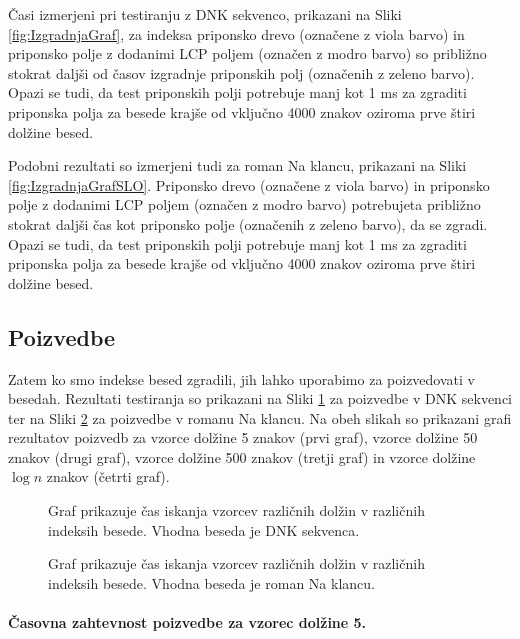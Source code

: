 Časi izmerjeni pri testiranju z DNK sekvenco, prikazani na Sliki \ref{fig:IzgradnjaGraf}, za indeksa priponsko drevo (označene z viola barvo) in priponsko polje z dodanimi LCP poljem (označen z modro barvo) so približno stokrat daljši od časov izgradnje priponskih polj (označenih z zeleno barvo). Opazi se tudi, da test priponskih polji potrebuje manj kot 1 ms za zgraditi priponska polja za besede krajše od vključno 4000 znakov oziroma prve štiri dolžine besed.



Podobni rezultati so izmerjeni tudi za roman Na klancu, prikazani na Sliki \ref{fig:IzgradnjaGrafSLO}. Priponsko drevo (označene z viola barvo) in priponsko polje z dodanimi LCP poljem (označen z modro barvo) potrebujeta približno stokrat daljši čas kot priponsko polje (označenih z zeleno barvo), da se zgradi. Opazi se tudi, da test priponskih polji potrebuje manj kot 1 ms za zgraditi priponska polja za besede krajše od vključno 4000 znakov oziroma prve štiri dolžine besed.


\subsection{Poizvedbe}
Zatem ko smo indekse besed zgradili, jih lahko uporabimo za poizvedovati v besedah. Rezultati testiranja so prikazani na Sliki \ref{fig:IskanjeGraf} za poizvedbe v DNK sekvenci ter na Sliki \ref{fig:IskanjeGrafSLO} za poizvedbe v romanu Na klancu. Na obeh slikah so prikazani grafi rezultatov poizvedb za vzorce dolžine 5 znakov (prvi graf), vzorce dolžine 50 znakov (drugi graf), vzorce dolžine 500 znakov (tretji graf) in vzorce dolžine $\log{n}$ znakov (četrti graf).

\begin{figure}[htb]
    \centering
    
    \caption{Graf prikazuje čas iskanja vzorcev različnih dolžin v različnih indeksih besede. Vhodna beseda je DNK sekvenca.} 
    \label{fig:IskanjeGraf}
\end{figure}

\begin{figure}[htb]
    \centering
    
    \caption{Graf prikazuje čas iskanja vzorcev različnih dolžin v različnih indeksih besede. Vhodna beseda je roman Na klancu.} 
    \label{fig:IskanjeGrafSLO}
\end{figure}

\paragraph{Časovna zahtevnost poizvedbe za vzorec dolžine 5.}

